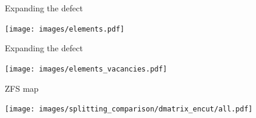 \documentclass[notes=hide]{beamer}
\begin{document}

\begin{frame}{Expanding the defect}
  \begin{center}
    \texttt{[image: images/elements.pdf]}
  \end{center}
\end{frame}

\begin{frame}{Expanding the defect}
  \begin{center}
    \texttt{[image: images/elements\_vacancies.pdf]}
  \end{center}
\end{frame}

\begin{frame}{ZFS map}
  \begin{center}
    \texttt{[image: images/splitting\_comparison/dmatrix\_encut/all.pdf]}
  \end{center}
\end{frame}


  
\end{document}
